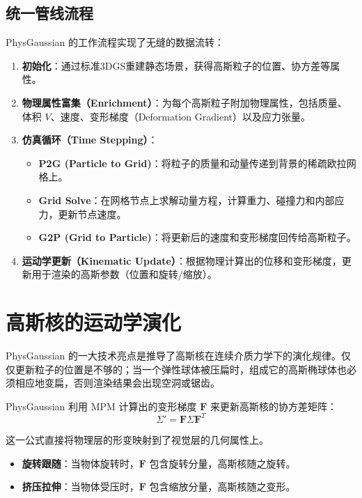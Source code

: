\subsection{统一管线流程}
PhysGaussian 的工作流程实现了无缝的数据流转：
\begin{enumerate}
	\item \textbf{初始化}：通过标准3DGS重建静态场景，获得高斯粒子的位置、协方差等属性。
	\item \textbf{物理属性富集（Enrichment）}：为每个高斯粒子附加物理属性，包括质量、体积 $V$、速度、变形梯度（Deformation Gradient）以及应力张量\cite{xie2024physgaussian_cvpr}。
	\item \textbf{仿真循环（Time Stepping）}：
	\begin{itemize}
		\item \textbf{P2G (Particle to Grid)}：将粒子的质量和动量传递到背景的稀疏欧拉网格上。
		\item \textbf{Grid Solve}：在网格节点上求解动量方程，计算重力、碰撞力和内部应力，更新节点速度。
		\item \textbf{G2P (Grid to Particle)}：将更新后的速度和变形梯度回传给高斯粒子。
	\end{itemize}
	\item \textbf{运动学更新（Kinematic Update）}：根据物理计算出的位移和变形梯度，更新用于渲染的高斯参数（位置和旋转/缩放）。
\end{enumerate}

\section{高斯核的运动学演化}
PhysGaussian 的一大技术亮点是推导了高斯核在连续介质力学下的演化规律。仅仅更新粒子的位置是不够的；当一个弹性球体被压扁时，组成它的高斯椭球体也必须相应地变扁，否则渲染结果会出现空洞或锯齿。

PhysGaussian 利用 MPM 计算出的变形梯度 $\mathbf{F}$ 来更新高斯核的协方差矩阵：
\begin{equation}
\Sigma' = \mathbf{F} \Sigma \mathbf{F}^T
\end{equation}

这一公式直接将物理层的形变映射到了视觉层的几何属性上。
\begin{itemize}
	\item \textbf{旋转跟随}：当物体旋转时，$\mathbf{F}$ 包含旋转分量，高斯核随之旋转。
	\item \textbf{挤压拉伸}：当物体受压时，$\mathbf{F}$ 包含缩放分量，高斯核随之变形。
\end{itemize}

